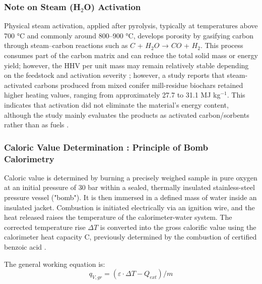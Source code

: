 \subsubsection{Note on Steam (\texorpdfstring{H$_2$O}{H2O}) Activation}
Physical steam activation, applied after pyrolysis, typically at temperatures above 700 °C and commonly around 800–900 °C, develops porosity by gasifying carbon through steam–carbon reactions such as $C$ + $H_2O$ → $CO$ + $H_2$. This process consumes part of the carbon matrix and can reduce the total solid mass or energy yield; however, the HHV per unit mass may remain relatively stable depending on the feedstock and activation severity \cite{sajjadi-2018};
however, a study reports that steam-activated carbons produced from mixed conifer mill-residue biochars retained higher heating values, ranging from approximately 27.7 to 31.1 MJ kg$^{-1}$. This indicates that activation did not eliminate the material’s energy content, although the study mainly evaluates the products as activated carbon/sorbents rather than as fuels \cite{anderson-2021}.





            




\subsubsection{Caloric Value Determination : Principle of Bomb Calorimetry}
\label{subsubsec:HHV}
Caloric value is determined by burning a precisely weighed sample in pure oxygen at an initial pressure of 30 bar within a sealed, thermally insulated stainless-steel pressure vessel ("bomb"). It is then immersed in a defined mass of water inside an insulated jacket. Combustion is initiated electrically via an ignition wire, and the heat released raises the temperature of the calorimeter-water system. The corrected temperature rise $\Delta T$ is converted into the gross calorific value using the calorimeter heat capacity C, previously determined by the combustion of certified benzoic acid \cite{iso18125_2017,astm_d5865_2019}.

The general working equation is:
\begin{equation} \label{equ: qvgr}
    q_{V,gr}=(\varepsilon \cdot \Delta T - Q_{ext} )/m
\end{equation}

